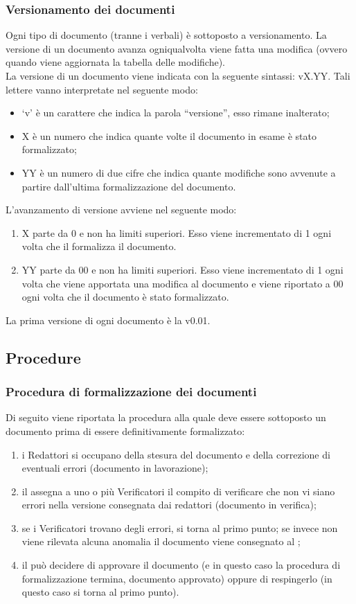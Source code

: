 		\subsubsection{Versionamento dei documenti} \label{sec:versioni}
			Ogni tipo di documento (tranne i verbali) è sottoposto a versionamento. La versione di un documento avanza ogniqualvolta viene fatta una modifica (ovvero quando viene aggiornata la tabella delle modifiche).\\
			La versione di un documento viene indicata con la seguente sintassi: vX.YY. Tali lettere vanno interpretate nel seguente modo:
			\begin{itemize}
				\item ‘v’ è un carattere che indica la parola “versione”, esso rimane inalterato;
				\item X è un numero che indica quante volte il documento in esame è stato formalizzato;
				\item YY è un numero di due cifre che indica quante modifiche sono avvenute a partire dall’ultima formalizzazione del documento.
			\end{itemize}
			L’avanzamento di versione avviene nel seguente modo:
			\begin{enumerate}
				\item X parte da 0 e non ha limiti superiori. Esso viene incrementato di 1 ogni volta che il  formalizza il documento.
				\item YY parte da 00 e non ha limiti superiori. Esso viene incrementato di 1 ogni volta che viene apportata una modifica al documento e viene riportato a 00 ogni volta che il documento è stato formalizzato.
			\end{enumerate}
			La prima versione di ogni documento è la v0.01.
	\subsection{Procedure}
		\subsubsection{Procedura di formalizzazione dei documenti}
			Di seguito viene riportata la procedura alla quale deve essere sottoposto un documento prima di essere definitivamente formalizzato:
			\begin{enumerate}
				\item i Redattori si occupano della stesura del documento e della correzione di eventuali errori (documento in lavorazione);
				\item il  assegna a uno o più Verificatori il compito di verificare che non vi siano errori nella versione consegnata dai redattori (documento in verifica);
				\item se i Verificatori trovano degli errori, si torna al primo punto; se invece non viene rilevata alcuna anomalia il documento viene consegnato al ;
				\item il  può decidere di approvare il documento (e in questo caso la procedura di formalizzazione termina, documento approvato) oppure di respingerlo (in questo caso si torna al primo punto).
			\end{enumerate}
